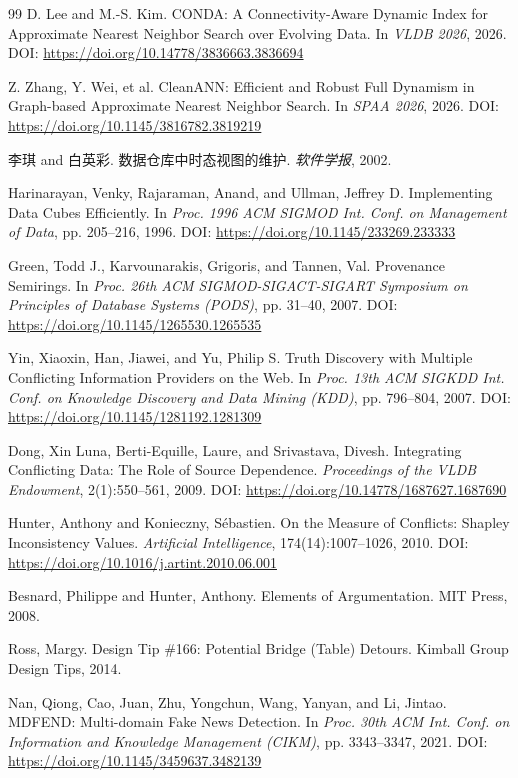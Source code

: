 \begin{thebibliography}{99}
 D. Lee and M.-S. Kim. CONDA: A Connectivity-Aware Dynamic Index for Approximate Nearest Neighbor Search over Evolving Data. In \emph{VLDB 2026}, 2026. DOI: \url{https://doi.org/10.14778/3836663.3836694}

 Z. Zhang, Y. Wei, et al. CleanANN: Efficient and Robust Full Dynamism in Graph-based Approximate Nearest Neighbor Search. In \emph{SPAA 2026}, 2026. DOI: \url{https://doi.org/10.1145/3816782.3819219}

 李琪 and 白英彩. 数据仓库中时态视图的维护. \emph{软件学报}, 2002.

 Harinarayan, Venky, Rajaraman, Anand, and Ullman, Jeffrey D. Implementing Data Cubes Efficiently. In \emph{Proc. 1996 ACM SIGMOD Int. Conf. on Management of Data}, pp. 205–216, 1996. DOI: \url{https://doi.org/10.1145/233269.233333}

 Green, Todd J., Karvounarakis, Grigoris, and Tannen, Val. Provenance Semirings. In \emph{Proc. 26th ACM SIGMOD-SIGACT-SIGART Symposium on Principles of Database Systems (PODS)}, pp. 31–40, 2007. DOI: \url{https://doi.org/10.1145/1265530.1265535}

 Yin, Xiaoxin, Han, Jiawei, and Yu, Philip S. Truth Discovery with Multiple Conflicting Information Providers on the Web. In \emph{Proc. 13th ACM SIGKDD Int. Conf. on Knowledge Discovery and Data Mining (KDD)}, pp. 796–804, 2007. DOI: \url{https://doi.org/10.1145/1281192.1281309}

 Dong, Xin Luna, Berti-Equille, Laure, and Srivastava, Divesh. Integrating Conflicting Data: The Role of Source Dependence. \emph{Proceedings of the VLDB Endowment}, 2(1):550–561, 2009. DOI: \url{https://doi.org/10.14778/1687627.1687690}

 Hunter, Anthony and Konieczny, Sébastien. On the Measure of Conflicts: Shapley Inconsistency Values. \emph{Artificial Intelligence}, 174(14):1007–1026, 2010. DOI: \url{https://doi.org/10.1016/j.artint.2010.06.001}

 Besnard, Philippe and Hunter, Anthony. Elements of Argumentation. MIT Press, 2008.

 Ross, Margy. Design Tip \#166: Potential Bridge (Table) Detours. Kimball Group Design Tips, 2014.

 Nan, Qiong, Cao, Juan, Zhu, Yongchun, Wang, Yanyan, and Li, Jintao. MDFEND: Multi-domain Fake News Detection. In \emph{Proc. 30th ACM Int. Conf. on Information and Knowledge Management (CIKM)}, pp. 3343–3347, 2021. DOI: \url{https://doi.org/10.1145/3459637.3482139}

\end{thebibliography}
